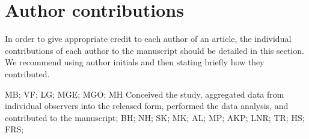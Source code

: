 \section*{Author contributions}
In order to give appropriate credit to each author of an article, the individual contributions of each author to the manuscript should be detailed in this section. We recommend using author initials and then stating briefly how they contributed.

MB;
VF;
LG;
MGE;
MGO;
MH Conceived the study, aggregated data from individual observers into the released form, performed the data analysis, and contributed to the manuscript;
BH;
NH;
SK;
MK;
AL;
MP;
AKP;
LNR;
TR;
HS;
FRS;
